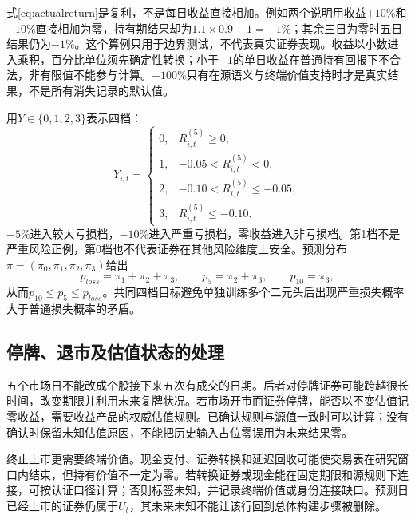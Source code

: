 式\eqref{eq:actualreturn}是复利，不是每日收益直接相加。例如两个说明用收益$+10\%$和$-10\%$直接相加为零，持有期结果却为$1.1\times0.9-1=-1\%$；其余三日为零时五日结果仍为$-1\%$。这个算例只用于边界测试，不代表真实证券表现。收益以小数进入乘积，百分比单位须先确定性转换；小于$-1$的单日收益在普通持有回报下不合法，非有限值不能参与计算。$-100\%$只有在源语义与终端价值支持时才是真实结果，不是所有消失记录的默认值。

用$Y\in\{0,1,2,3\}$表示四档：
\begin{equation}
Y_{i,t}=\begin{cases}
0,&R_{i,t}^{(5)}\ge0,\\
1,&-0.05<R_{i,t}^{(5)}<0,\\
2,&-0.10<R_{i,t}^{(5)}\le-0.05,\\
3,&R_{i,t}^{(5)}\le-0.10.
\end{cases}
\label{eq:bins}
\end{equation}
$-5\%$进入较大亏损档，$-10\%$进入严重亏损档，零收益进入非亏损档。第1档不是严重风险正例，第0档也不代表证券在其他风险维度上安全。预测分布$\pi=(\pi_0,\pi_1,\pi_2,\pi_3)$给出
\begin{equation}
 p_{loss}=\pi_1+\pi_2+\pi_3,\qquad
 p_5=\pi_2+\pi_3,\qquad p_{10}=\pi_3,
 \label{eq:nested}
\end{equation}
从而$p_{10}\le p_5\le p_{loss}$。共同四档目标避免单独训练多个二元头后出现严重损失概率大于普通损失概率的矛盾。


\subsection{停牌、退市及估值状态的处理}
五个市场日不能改成个股接下来五次有成交的日期。后者对停牌证券可能跨越很长时间，改变期限并利用未来复牌状况。若市场开市而证券停牌，能否以不变估值记零收益，需要收益产品的权威估值规则。已确认规则与源值一致时可以计算；没有确认时保留未知估值原因，不能把历史输入占位零误用为未来结果零。

终止上市更需要终端价值。现金支付、证券转换和延迟回收可能使交易表在研究窗口内结束，但持有价值不一定为零。若转换证券或现金能在固定期限和源规则下连接，可按认证口径计算；否则标签未知，并记录终端价值或身份连接缺口。预测日已经上市的证券仍属于$U_t$，其未来未知不能让该行回到总体构建步骤被删除。

